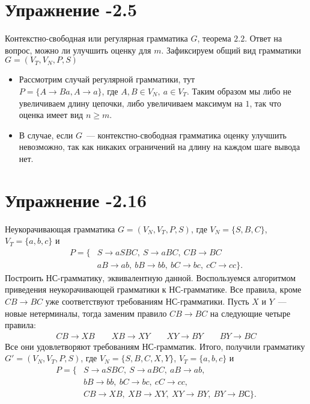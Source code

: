 \documentclass[12pt, a4paper, oneside]{memoir}
\begin{document}
\section*{Упражнение -2.5}
\begin{solution}
    {Контекстно-свободная или регулярная грамматика $G$, теорема $2.2$.}
    {Ответ  на вопрос, можно ли улучшить оценку для $m$.}
    {}
    Зафиксируем общий вид грамматики $G = (V_T, V_N, P, S)$
    \begin{itemize}
        \item Рассмотрим случай регулярной грамматики, тут \\ $P = \{A \to Ba, A \to a \}$, где $A, B \in V_N, \ a\in V_T$. Таким образом мы либо не увеличиваем длину цепочки, либо увеличиваем максимум на $1$,  так что оценка имеет вид $n\geq m$.
        \item В случае, если $G$~--- контекстно-свободная грамматика оценку улучшить невозможно, так как никаких ограничений на длину на каждом шаге вывода нет. 
    \end{itemize}
\end{solution}

\section*{Упражнение -2.16}
\begin{solution}
    {Неукорачивающая грамматика $G = (V_N, V_T, P, S)$, где $V_N = \{S, B, C\}$, $V_T = \{a,b,c\}$ и
        \begin{align*}
            P = \{ & S \to aSBC,\ S \to aBC,\ CB \to BC               \\
                   & aB \to ab,\ bB \to bb,\ bC \to bc,\ cC \to cc\}.
        \end{align*}}
    {Построить НС-грамматику, эквивалентную данной.}
    {Воспользуемся алгоритмом приведения неукорачивающей грамматики к НС-грамматике.}
    Все правила, кроме $CB \to BC$ уже соответствуют требованиям НС-грамматики.
    Пусть $X$ и $Y$~--- новые нетерминалы, тогда заменим правило $CB \to BC$ на следующие четыре правила:
    \begin{gather*}
        CB \to XB \qquad XB \to XY \qquad XY \to BY \qquad BY \to BC
    \end{gather*}
    Все они удовлетворяют требованиям НС-грамматик.
    Итого, получили грамматику $G' = (V_N, V_T, P, S)$, где $V_N = \{S, B, C, X, Y\}$, $V_T = \{a,b,c\}$ и
    \begin{align*}
        P = \{ & S \to aSBC,\ S \to aBC,\ aB \to ab,                \\
               & bB \to bb,\ bC \to bc,\ cC \to cc,                 \\
               & CB \to XB,\ XB \to XY, \ XY \to BY, \ BY \to BС\}.
    \end{align*}
\end{solution}
\end{document}
